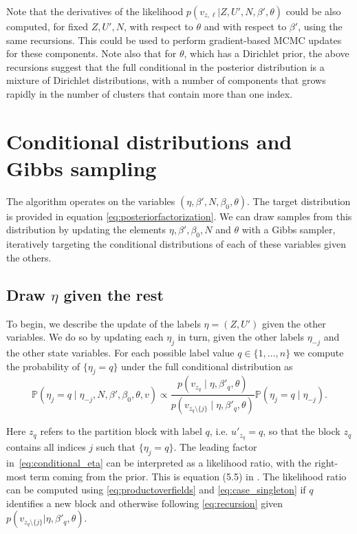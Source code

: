 \documentclass{article}
\begin{document}
Note that the derivatives of the likelihood 
$p(v_{z,\ell}|Z,U',N,\beta',\theta)$
could be also computed, for fixed $Z,U',N$, with respect to $\theta$
and with respect to $\beta'$, using the same recursions.
This could be used to perform gradient-based MCMC 
updates for these components.
Note also that for $\theta$, which has a Dirichlet
prior, the above recursions suggest that the full
conditional in the posterior distribution 
is a mixture of Dirichlet distributions,
with a number of components that grows rapidly in the number
of clusters that contain more than one index.

\section{Conditional distributions and Gibbs sampling}

The algorithm operates on the variables
$(\eta, \beta', N, \beta_0, \theta)$. The target
distribution is provided in equation \eqref{eq:posteriorfactorization}. 
We can draw samples from this distribution by updating the elements 
$\eta, \beta', \beta_0,N$ and $\theta$ with a Gibbs sampler, 
iteratively targeting the conditional distributions of each of these
variables given the others.

\subsection{Draw \texorpdfstring{$\eta$}{eta} given the rest}

To begin, we describe the update of the labels $\eta = (Z, U')$ given the other variables. We do so by
updating each $\eta_j$ in turn, given the other labels $\eta_{-j}$ and the other state variables.
For each possible label value $q \in \{1,\ldots,n\}$
we compute the probability of $\{\eta_j = q\}$
under the full conditional distribution as
\begin{equation}
    \label{eq:conditional_eta}
    \mathbb{P}\left(\eta_j = q \mid \eta_{-j}, N, \beta',\beta_0, \theta, v\right) \propto
    \frac{p(v_{z_q}\mid \eta, \beta'_q,\theta)}{p(v_{z_{q}\setminus\{j\}}\mid \eta, \beta'_q,\theta)}
    \mathbb{P}\left(\eta_j = q \mid \eta_{-j}\right).
\end{equation}

Here $z_q$ refers to the partition block with label
$q$, i.e. $u'_{z_q} = q$, so that the block $z_q$
contains all indices $j$ such that $\{\eta_j = q\}$.
The leading factor in~\eqref{eq:conditional_eta} can be interpreted as a
likelihood ratio, with the right-most term coming from the prior. This is equation (5.5) in \citet{tancredi2018unified}. The likelihood ratio can be computed using
\eqref{eq:productoverfields} and \eqref{eq:case_singleton}
if $q$ identifies a new block and
otherwise following \eqref{eq:recursion} given $p(v_{z_q\setminus\{j\}}|\eta,\beta'_q,\theta)$.
\end{document}
